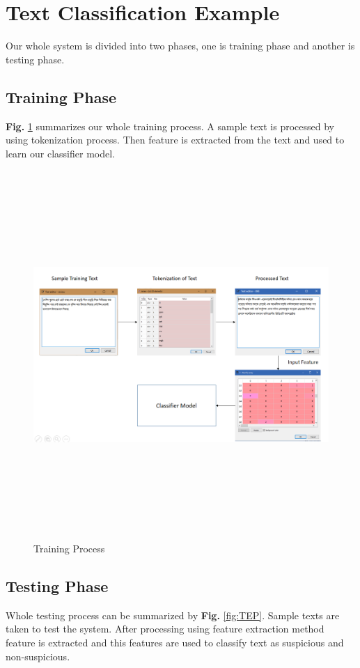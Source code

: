 \section{Text Classification Example}
Our whole system is divided into two phases, one is training phase and another is testing phase.
\subsection{Training Phase}
\textbf{Fig.} \ref{fig:TP} summarizes our whole training process. A sample text is processed by using tokenization process. Then feature is extracted from the text and used to learn our classifier model.
\vspace{1cm}
\begin{figure}[h!]
    \centering
    \includegraphics[width=15cm,height=14cm]{Figures/training_phase.PNG}
    \caption{Training Process}
    \label{fig:TP}
\end{figure}
\clearpage
\subsection{Testing Phase}
Whole testing process can be summarized by \textbf{Fig.} \ref{fig:TEP}. Sample texts are taken to test the system. After processing using feature extraction method feature is extracted and this features are used to classify text as suspicious and non-suspicious.


